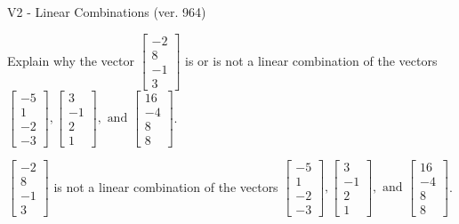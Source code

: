 \begin{exercise}
  \begin{exerciseTitle}V2 - Linear Combinations (ver. 964)\end{exerciseTitle}
  \begin{exerciseStatement}
    Explain why the vector \(\left[\begin{array}{c}
-2 \\
8 \\
-1 \\
3
\end{array}\right]\)  is or is not a linear 
	combination of the vectors \(\left[\begin{array}{c}
-5 \\
1 \\
-2 \\
-3
\end{array}\right] , \left[\begin{array}{c}
3 \\
-1 \\
2 \\
1
\end{array}\right] , \text{ and } \left[\begin{array}{c}
16 \\
-4 \\
8 \\
8
\end{array}\right]\).
	


  \end{exerciseStatement}
  \begin{exerciseAnswer}
   \(\left[\begin{array}{c}
-2 \\
8 \\
-1 \\
3
\end{array}\right]\) 
  	 is not  
	a linear combination of the vectors \(\left[\begin{array}{c}
-5 \\
1 \\
-2 \\
-3
\end{array}\right] , \left[\begin{array}{c}
3 \\
-1 \\
2 \\
1
\end{array}\right] , \text{ and } \left[\begin{array}{c}
16 \\
-4 \\
8 \\
8
\end{array}\right]\).

	
  


  \end{exerciseAnswer}
\end{exercise}
